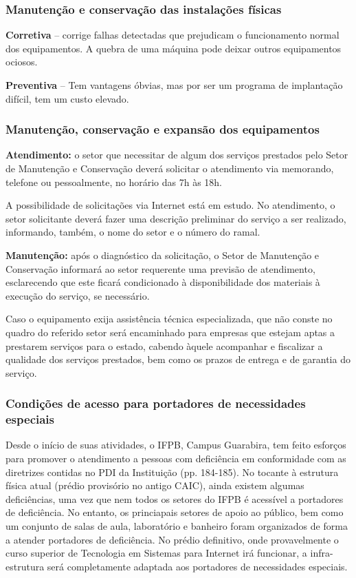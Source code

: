 \subsubsection{Manuten\c{c}\~ao e conserva\c{c}\~ao das instala\c{c}\~oes f\'isicas}


\textbf{Corretiva} – corrige falhas detectadas que prejudicam o funcionamento normal dos equipamentos. A quebra de uma máquina pode deixar outros equipamentos ociosos.

\vspace{2mm}
\textbf{Preventiva} – Tem vantagens óbvias, mas por ser um programa de implantação difícil, tem um custo elevado.


\subsubsection{Manutenção, conservação e expansão dos equipamentos}

\textbf{Atendimento: } o setor que necessitar de algum dos serviços prestados pelo Setor de Manutenção e Conservação deverá solicitar o atendimento via memorando, telefone ou pessoalmente, no horário das 7h às 18h. 

	A possibilidade de solicitações via Internet está em estudo. No atendimento, o setor solicitante deverá fazer uma descrição preliminar do serviço a ser realizado, informando, também, o nome do setor e o número do ramal.

\vspace{2mm}
\textbf{Manuten\c{c}\~ao:} após o diagnóstico da solicitação, o Setor de Manutenção e Conservação informará ao setor requerente uma previsão de atendimento, esclarecendo que este ficará condicionado à disponibilidade dos materiais à execução do serviço, se necessário.

	Caso o equipamento exija assistência técnica especializada, que não conste no quadro do referido setor será encaminhado para empresas que estejam aptas a prestarem serviços para o estado, cabendo àquele acompanhar e fiscalizar a qualidade dos serviços prestados, bem como os prazos de entrega e de garantia do serviço.

\subsubsection{Condições de acesso para portadores de necessidades especiais}

	Desde o início de suas atividades, o IFPB, Campus Guarabira, tem feito esforços para promover o atendimento a pessoas com deficiência em conformidade com as diretrizes contidas no PDI da Instituição (pp. 184-185). No tocante à estrutura física atual (pr\'edio provis\'orio no antigo CAIC), ainda existem algumas defici\^encias, uma vez que nem todos os setores do IFPB \'e acess\'ivel a portadores de defici\^encia. No entanto, os princiapais setores de apoio ao p\'ublico, bem como um conjunto de salas de aula, laborat\'orio e banheiro foram organizados de forma a atender portadores de defici\^encia. No pr\'edio definitivo, onde provavelmente o curso superior de Tecnologia em Sistemas para Internet ir\'a funcionar, a infra-estrutura ser\'a completamente adaptada aos portadores de necessidades especiais.

